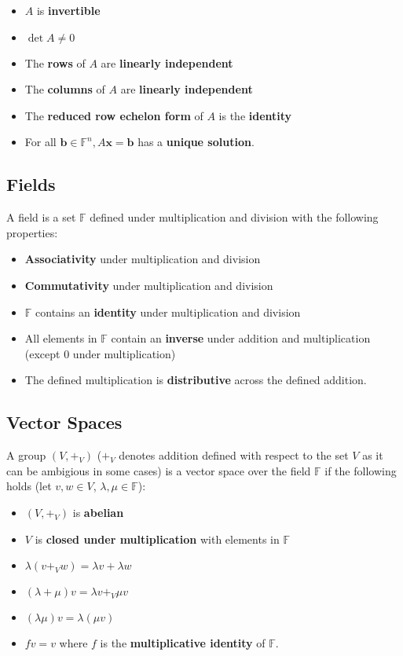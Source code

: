 \documentclass[a4paper, 12pt, twoside]{article}
\begin{document}
\begin{itemize}
  \item $A$ is \textbf{invertible}
  \item $\det{A} \neq 0$
  \item The \textbf{rows} of $A$ are \textbf{linearly independent}
  \item The \textbf{columns} of $A$ are \textbf{linearly independent}
  \item The \textbf{reduced row echelon form} of $A$ is the \textbf{identity}
  \item For all $\textbf{b} \in \mathbb{F}^n, A\textbf{x} = \textbf{b}$ has
        a \textbf{unique solution}.
\end{itemize}

\subsection{Fields}

A field is a set $\mathbb{F}$ defined under multiplication and division with the
following properties:

\begin{itemize}
  \item \textbf{Associativity} under multiplication and division
  \item \textbf{Commutativity} under multiplication and division
  \item $\mathbb{F}$ contains an \textbf{identity} under multiplication and division
  \item All elements in $\mathbb{F}$ contain an \textbf{inverse} under addition and
        multiplication (except $0$ under multiplication)
  \item The defined multiplication is \textbf{distributive} across
        the defined addition.
\end{itemize}

\subsection{Vector Spaces}

A group $(V, +_{V})$ ($+_{V}$ denotes addition defined with respect to the
set $V$ as it can be ambigious in some cases) is a vector space over the field
$\mathbb{F}$ if the following holds (let $v, w \in V$, $\lambda, \mu \in
  \mathbb{F}$):

\begin{itemize}
  \item $(V, +_{V})$ is \textbf{abelian}
  \item $V$ is \textbf{closed under multiplication} with elements in
        $\mathbb{F}$
  \item $\lambda(v +_{V} w) = \lambda v + \lambda w$
  \item $(\lambda + \mu)v = \lambda v +_{V} \mu v$
  \item $(\lambda \mu)v = \lambda (\mu v)$
  \item $fv = v$ where $f$ is the \textbf{multiplicative identity} of
        $\mathbb{F}$.
\end{itemize}
\end{document}
